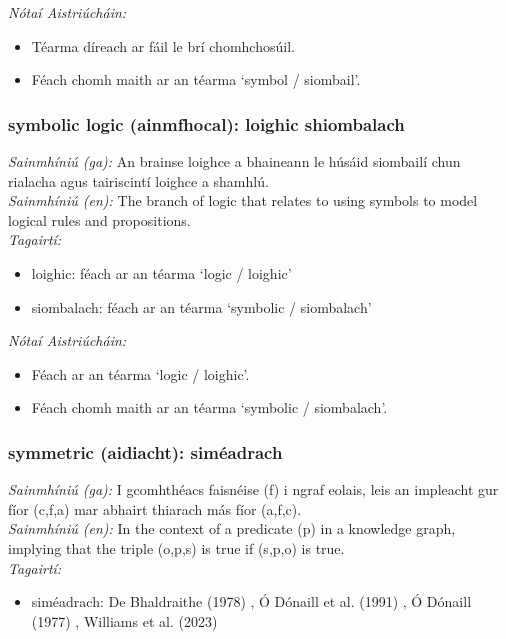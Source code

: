  \noindent \textit{Nótaí Aistriúcháin:}
\begin{itemize}
	\item Téarma díreach ar fáil le brí chomhchosúil.
	\item Féach chomh maith ar an téarma `symbol / siombail'.
\end{itemize}


\subsubsection*{symbolic logic (ainmfhocal): loighic shiombalach}
 \noindent \textit{Sainmhíniú (ga):} An brainse loighce a bhaineann le húsáid siombailí chun rialacha agus tairiscintí loighce a shamhlú.
\\
 \noindent \textit{Sainmhíniú (en):} The branch of logic that relates to using symbols to model logical rules and propositions.
\\
 \noindent \textit{Tagairtí:}
\begin{itemize}
	\item loighic: féach ar an téarma `logic / loighic'
	\item siombalach: féach ar an téarma `symbolic / siombalach'
\end{itemize}

 \noindent \textit{Nótaí Aistriúcháin:}
\begin{itemize}
	\item Féach ar an téarma `logic / loighic'.
	\item Féach chomh maith ar an téarma `symbolic / siombalach'.
\end{itemize}


\subsubsection*{symmetric (aidiacht): siméadrach}
 \noindent \textit{Sainmhíniú (ga):} I gcomhthéacs faisnéise (f) i ngraf eolais, leis an impleacht gur fíor (c,f,a) mar abhairt thiarach más fíor (a,f,c).
\\
 \noindent \textit{Sainmhíniú (en):} In the context of a predicate (p) in a knowledge graph, implying that the triple (o,p,s) is true if (s,p,o) is true.
\\
 \noindent \textit{Tagairtí:}
\begin{itemize}
	\item siméadrach: De Bhaldraithe (1978) \cite{de-bhaldraithe}, Ó Dónaill et al. (1991) \cite{focloir-beag}, Ó Dónaill (1977) \cite{odonaill}, Williams et al. (2023) \cite{storchiste}
\end{itemize}

